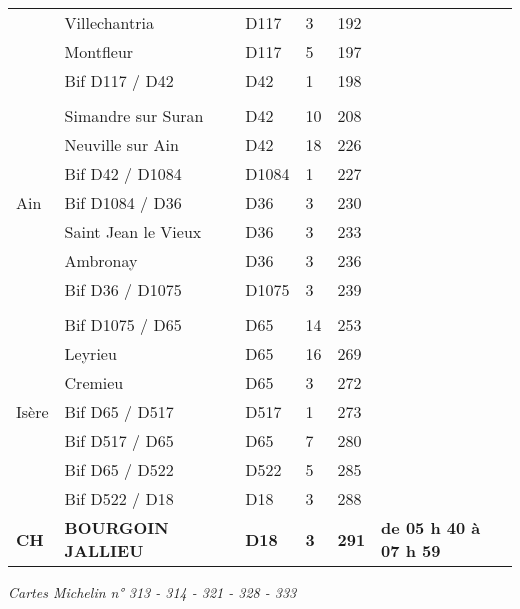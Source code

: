 \documentclass{article}%
\begin{document}
\begin{longtable}{p{2.25cm}|p{7.0cm}|p{1.5cm}|p{1.5cm}|p{1.5cm}|p{3.5cm}}
 &Villechantria&D117&3&192& \\%
 &Montfleur&D117&5&197& \\%
 &Bif D117 / D42&D42&1&198& \\%
\hline& & & & & \\%
 &Simandre sur Suran&D42&10&208& \\%
 &Neuville sur Ain&D42&18&226& \\%
 &Bif D42 / D1084&D1084 &1&227& \\%
Ain&Bif D1084 / D36&D36&3&230& \\%
 &Saint Jean le Vieux&D36&3&233& \\%
 &Ambronay&D36&3&236& \\%
 &Bif D36 / D1075&D1075&3&239& \\%
\hline& & & & & \\%
 &Bif D1075 / D65&D65&14&253& \\%
 &Leyrieu&D65&16&269& \\%
 &Cremieu&D65&3&272& \\%
Isère&Bif D65 / D517&D517 &1&273& \\%
 &Bif D517 / D65&D65 &7&280& \\%
 &Bif D65 / D522&D522&5&285& \\%
 &Bif D522 / D18&D18&3&288& \\%
\textbf{                               CH }&\textbf{BOURGOIN  JALLIEU}&\textbf{D18}&\textbf{3}&\textbf{291}&\textbf{de 05 h 40 à 07 h 59}\\%
\hline%
\end{longtable}%
\begin{flushleft} \textit{Cartes Michelin n° 
313 - 314 - 321 - 328 - 333
} \end{flushleft}%
\end{document}
